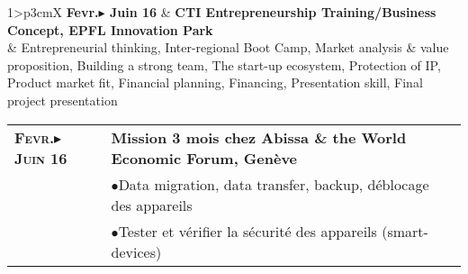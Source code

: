 \documentclass[a4paper,10pt]{article}
\begin{document}
\begin{tabularx}{1\linewidth}{>{\raggedleft\scshape}p{3cm}X}
	\textbf{Fevr.$\blacktriangleright$ Juin 16} & \textbf{CTI Entrepreneurship Training/Business Concept, EPFL Innovation Park}\\ 
	 & Entrepreneurial thinking, Inter-regional Boot Camp, Market analysis \& value proposition, 
	Building a strong team, The start-up ecosystem, Protection of IP, Product market fit, Financial planning, Financing, 
	Presentation skill, Final project presentation
\end{tabularx}

\begin{tabularx}{1\linewidth}{>{\raggedleft\scshape}p{3cm}X}
	\textbf{Fevr.$\blacktriangleright$ Juin 16} & \textbf{Mission 3 mois chez Abissa \& the World Economic Forum, Genève}\\ 
	\poubelle{Exp\'erience} & $ \bullet $\quad Data migration, data transfer, backup, déblocage des appareils \\
	& $\bullet$\quad Tester et vérifier la sécurité des appareils (smart-devices)
\end{tabularx}
\end{document}
